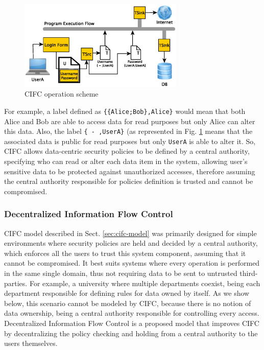 \begin{figure}[t!]
\includegraphics[width=0.7\textwidth]{figs/cifc-model}
\centering
\caption{CIFC operation scheme}
\label{fig:cifc-model}
\end{figure} 

For example, a label defined as \texttt{\{\{Alice;Bob\},Alice\}} would mean that both Alice and Bob are able to access data for read purposes but only Alice can alter this data. Also, the label \texttt{\{ - ,UserA\}} (as represented in Fig. \ref{fig:cifc-model} means that the associated data is public for read purposes but only \texttt{UserA} is able to alter it.
So, CIFC allows data-centric security policies to be defined by a central authority, specifying who can read or alter each data item in the system, allowing user's sensitive data to be protected against unauthorized accesses, therefore assuming the central authority responsible for policies definition is trusted and cannot be compromised.

\subsubsection{Decentralized Information Flow Control}
\label{sec:difc-model}
CIFC model described in Sect. \ref{sec:cifc-model} was primarily designed for simple environments where security policies are held and decided by a central authority, which enforces all the users to trust this system component, assuming that it cannot be compromised. It best suits systems where every operation is performed in the same single domain, thus not requiring data to be sent to untrusted third-parties. For example, a university where multiple departments coexist, being each department responsible for defining rules for data owned by itself. As we show below, this scenario cannot be modeled by CIFC, because there is no notion of data ownership, being a central authority responsible for controlling every access. Decentralized Information Flow Control \cite{difc} is a proposed model that improves CIFC by decentralizing the policy checking and holding from a central authority to the users themselves.

